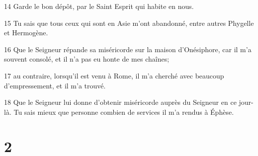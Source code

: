\par 14 Garde le bon dépôt, par le Saint Esprit qui habite en nous.
\par 15 Tu sais que tous ceux qui sont en Asie m'ont abandonné, entre autres Phygelle et Hermogène.
\par 16 Que le Seigneur répande sa miséricorde sur la maison d'Onésiphore, car il m'a souvent consolé, et il n'a pas eu honte de mes chaînes;
\par 17 au contraire, lorsqu'il est venu à Rome, il m'a cherché avec beaucoup d'empressement, et il m'a trouvé.
\par 18 Que le Seigneur lui donne d'obtenir miséricorde auprès du Seigneur en ce jour-là. Tu sais mieux que personne combien de services il m'a rendus à Éphèse.

\chapter{2}

